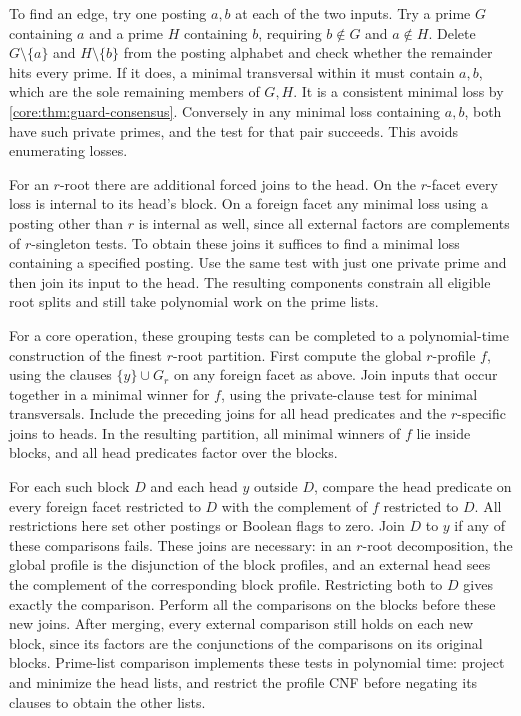 To find an edge, try one posting $a,b$ at each of the
two inputs. Try a prime $G$ containing $a$ and a prime
$H$ containing $b$, requiring $b\notin G$ and
$a\notin H$. Delete $G\setminus\{a\}$ and
$H\setminus\{b\}$ from the posting alphabet and
check whether the remainder hits every prime.
If it does, a minimal transversal within it must
contain $a,b$, which are the sole remaining members
of $G,H$. It is a consistent minimal loss by
\cref{core:thm:guard-consensus}. Conversely in any
minimal loss containing $a,b$, both have such
private primes, and the test for that pair succeeds.
This avoids enumerating losses.

For an $r$-root there are additional forced joins
to the head. On the $r$-facet every loss is internal
to its head's block. On a foreign facet any minimal
loss using a posting other than $r$ is internal
as well, since all external factors are complements
of $r$-singleton tests. To obtain these joins it
suffices to find a minimal loss containing a
specified posting. Use the same test with just
one private prime and then join its input to the
head. The resulting components constrain all
eligible root splits and still take polynomial work
on the prime lists.

For a core operation, these grouping tests can be
completed to a polynomial-time construction of the
finest $r$-root partition. First compute the global
$r$-profile $f$, using the clauses $\{y\}\cup G_r$
on any foreign facet as above. Join inputs that
occur together in a minimal winner for $f$, using
the private-clause test for minimal transversals.
Include the preceding joins for all head predicates
and the $r$-specific joins to heads. In the resulting
partition, all minimal winners of $f$ lie inside
blocks, and all head predicates factor over the
blocks.

For each such block $D$ and each head $y$ outside
$D$, compare the head predicate on every foreign
facet restricted to $D$ with the complement of $f$
restricted to $D$. All restrictions here set other
postings or Boolean flags to zero. Join $D$ to $y$
if any of these comparisons fails. These joins are
necessary: in an $r$-root decomposition, the global
profile is the disjunction of the block profiles,
and an external head sees the complement of the
corresponding block profile. Restricting both to
$D$ gives exactly the comparison. Perform all the
comparisons on the blocks before these new joins.
After merging, every external comparison still
holds on each new block, since its factors are
the conjunctions of the comparisons on its original
blocks. Prime-list comparison implements these
tests in polynomial time: project and minimize
the head lists, and restrict the profile CNF before
negating its clauses to obtain the other lists.

